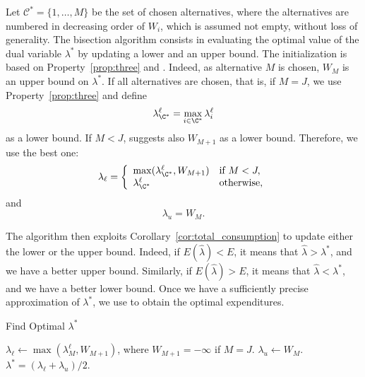 \documentclass[12pt,a4paper]{article}
\begin{document}
Let $\mathcal{C}^*=\{1,\ldots, M \}$ be the set of chosen alternatives, where the alternatives are numbered in
decreasing order of $W_i$, which is assumed not empty, without loss of generality. The bisection algorithm consists in evaluating the optimal value of the dual variable $\lambda^*$
by updating a lower and an upper bound.
The initialization is based on Property~\ref{prop:three} and . Indeed, as alternative $M$ is chosen,
$W_M$ is an upper bound on $\lambda^*$.
If all alternatives are chosen, that is, if $M=J$, we use Property~\ref{prop:three} and define
\[
   \lambda^\ell_{\C^*} =  \max_{i\in \C^*} \lambda^\ell_i
\]
as a lower bound.
If $M < J$,  suggests also $W_{M+1}$ as a lower bound. Therefore, we use the best one:\[
    \lambda_{\ell}  =\left\{\begin{array}{ll}
         \max(\lambda^\ell_{\C^*}, W_{M+1}) & \text{if } M < J, \\
                       \lambda^\ell_{\C^*}  & \text{otherwise}, \\
    \end{array}\right.
    \]
    and
    \[
         \lambda_{u} = W_{M}.
    \]


    The algorithm then exploits Corollary~\ref{cor:total_consumption} to update either the lower or the upper bound.
Indeed, if $E(\widehat{\lambda}) < E$, it means that $\widehat{\lambda} > \lambda^*$, and we have a better upper bound.
Similarly, if $E(\widehat{\lambda}) > E$, it means that $\widehat{\lambda} < \lambda^*$, and we have a better lower bound.
Once we have a sufficiently precise approximation of $\lambda^*$, we use  to obtain the
optimal expenditures.



\begin{algorithm}[htb]
\caption{\label{algo:bisection}Find Optimal $\lambda^*$}
\DontPrintSemicolon
{}
\BlankLine
$\lambda_\ell \leftarrow \max(\lambda^\ell_{M}, W_{M+1})$, where $W_{M+1}=-\infty$ if $M=J$.\;
$\lambda_u \leftarrow W_M$.\;
$\lambda^* = (\lambda_{\ell} + \lambda_u) / 2$.\;
\end{algorithm}
\end{document}
